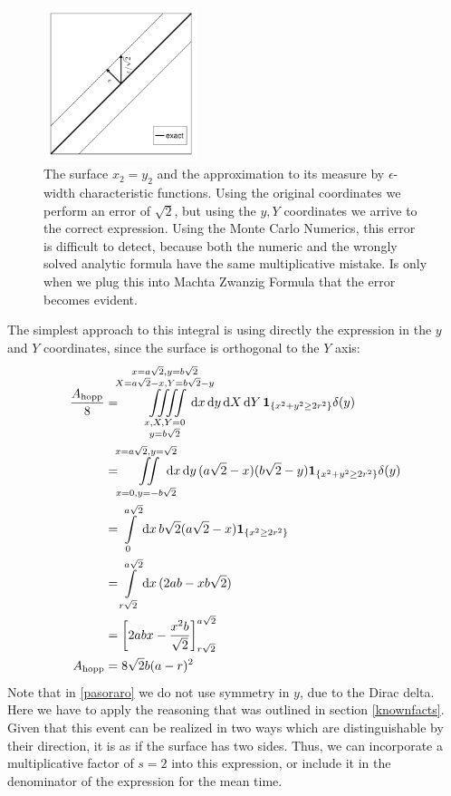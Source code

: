 \documentclass[superscriptaddress,pre,reprint,showpacs,twocolumn]{revtex4-1}
\newcommand{\rd}[1]{\mathrm{d}{#1} \,}
\newcommand{\indicatorsymbol}{\mathbf{1}}
\newcommand{\indicator}[1]{\indicatorsymbol_{ \{   #1 \} } }
\begin{document}
\begin{figure}
\includegraphics[width=0.4\textwidth]{figures/diagramdelta01.pdf}
\caption{The surface $x_2=y_2$ and the approximation to its measure by
  $\epsilon$-width characteristic functions. Using the original coordinates
  we perform an error of $\sqrt{2}$, but using the $y,Y$ coordinates
  we arrive to the correct expression. Using the Monte Carlo Numerics, this
  error is difficult to detect, because both the numeric and the wrongly solved
  analytic formula have the same multiplicative mistake. Is only when we plug this into
Machta Zwanzig Formula that the error becomes evident. }\label{DiagramaDelta01}
\end{figure}

The simplest approach to this integral is using directly the expression in the $y$ and $Y$
coordinates, since the surface is orthogonal to the $Y$ axis:
  \begin{align} 
    \frac{A_\text{hopp}}{8} & = \iiiint \limits_
      {\substack{x, X, Y=0 \\ y=b\sqrt{2}}}^
               {\substack{x=a\sqrt{2}, y=b\sqrt{2} \\
                   X=a\sqrt{2}-x, Y =b \sqrt{2}-y }}
                \mkern-36mu
     \rd x   \rd y  \rd X   \rd Y
     \indicator{x^2+y^2 \geq 2 r^2} \delta (y)
     \label{pasoraro}
     \\   
     &=  \iint \limits_{x=0, y=-b\sqrt{2}}^{x=a\sqrt{2}, y=\sqrt{2}}
    \mkern-18mu  \rd x \rd y 
    (a\sqrt{2}-x)(b\sqrt{2}-y)
    \indicator{x^2+y^2 \geq 2 r^2} \delta (y)
    \\
    &= \int \limits _0^{a\sqrt{2}} \rd x
    b\sqrt{2} (a\sqrt{2}-x)
    \indicator{x^2\geq 2 r^2}
    \\
    &= \int\limits_{r\sqrt{2}}^{a\sqrt{2}} \rd x
    (2ab-xb\sqrt{2})
    \\
    &=\biggl[2abx-\frac{x^2b}{\sqrt{2}} \biggr]_{r\sqrt{2}}^{a\sqrt{2}}\\
      A_\text{hopp}&=8\sqrt{2}b(a-r)^2
  \end{align}
  Note that in \eqref{pasoraro} we do not use symmetry in
  $y$, due to the Dirac delta.
  Here we have to apply the reasoning that was outlined in section \ref{knownfacts}.
  Given that this event can be realized in two ways which are
  distinguishable by their direction, it is as if the surface has two sides.
  Thus, we can incorporate a multiplicative factor of $s=2$ into this expression, or include it in the denominator of 
  the expression for the mean time.
\end{document}
